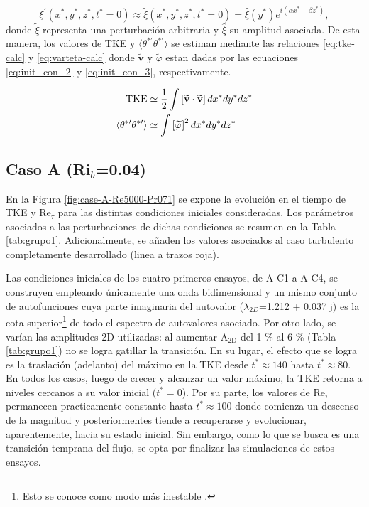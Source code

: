 $$\xi^{\prime} (x^*,y^*,z^*,t^* = 0) \approx \widetilde{\xi}(x^*,y^*,z^*,t^*=0) =  \widehat{\xi}(y^*) e^{i (\alpha x^* + \beta z^*)} , $$
donde $\widetilde{\xi}$ representa una perturbación arbitraria y $\widehat{\xi}$ su amplitud asociada. De esta manera, los valores de TKE y $\langle \theta^{* \prime} \theta^{* \prime} \rangle$ se estiman mediante las relaciones \ref{eq:tke-calc} y \ref{eq:varteta-calc} donde $\widetilde{\mathbf{v}}$ y $\widetilde{\varphi}$ estan dadas por las ecuaciones \ref{eq:init_con_2} y \ref{eq:init_con_3}, respectivamente.

\begin{align}
\text{TKE} &\simeq \frac{1}{2} \int \left[ \widetilde{\mathbf{v}} \cdot \widetilde{\mathbf{v}} \right] dx^* dy^* dz^* 
\label{eq:tke-calc}\\
\langle \theta^{* \prime} \theta^{* \prime} \rangle  &\simeq \int \left[ \widetilde{\varphi} \hspace{0.2mm} \right]^2 dx^* dy^* dz^* 
\label{eq:varteta-calc}
\end{align}  


\subsection{Caso A (Ri$_b$=0.04)}

En la Figura \ref{fig:case-A-Re5000-Pr071} se expone la evolución en el tiempo de TKE y Re$_{\tau}$ para las distintas condiciones iniciales consideradas. Los parámetros asociados a las perturbaciones de dichas condiciones se resumen en la Tabla \ref{tab:grupo1}. Adicionalmente, se añaden los valores asociados al caso turbulento completamente desarrollado (linea a trazos roja).  

Las condiciones iniciales de los cuatro primeros ensayos, de A‑C1 a A‑C4, se construyen empleando únicamente una onda bidimensional y un mismo conjunto de autofunciones cuya parte imaginaria del autovalor ($\lambda_{2D}$=1.212 + 0.037 j) es la cota superior\footnote{Esto  se conoce como modo más inestable \cite{schmid}.} de todo el espectro de autovalores asociado. Por otro lado, se varían las amplitudes 2D utilizadas: al aumentar A$_\text{2D}$ del 1 \% al 6 \% (Tabla \ref{tab:grupo1})  no se logra gatillar la transición. En su lugar, el efecto que se logra es la traslación (adelanto) del máximo en la TKE desde $t^* \approx 140$ hasta $t^* \approx 80$. En todos los casos, luego de crecer y alcanzar un valor máximo, la TKE retorna a niveles cercanos a su valor inicial ($t^*=0$). Por su parte, los valores de Re$_{\tau}$ permanecen practicamente constante hasta $t^* \approx 100$ donde comienza un descenso de la magnitud y posteriormentes tiende a recuperarse y evolucionar, aparentemente, hacia su estado inicial. Sin embargo, como lo que se busca es una transición temprana del flujo, se opta por finalizar las simulaciones de estos ensayos.  

